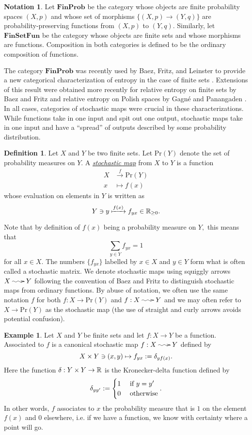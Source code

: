 \documentclass[12pt]{article}
\makeatletter
\theoremstyle{theorem}
\theoremstyle{definition}
\newtheorem{definition}[equation]{Definition}
\newtheorem{example}[equation]{Example}
\newtheorem{notation}[equation]{Notation}
\numberwithin{equation}{section}
\newcommand{\be}{\begin{equation}}
\newcommand{\ee}{\end{equation}}
\newcommand{\bx}{\begin{example}}
\newcommand{\ex}{\end{example}}
\newcommand{\bd}{\begin{definition}}
\newcommand{\ed}{\end{definition}}
\newcommand{\<}{\langle}
\renewcommand{\>}{\rangle}
\def\R{{{\mathbb R}}}
\newcommand{\FinSetFun}{\mathbf{FinSetFun}}
\newcommand{\FinProb}{\mathbf{FinProb}}
\newcommand{\stoch}{\;\xy0;/r.25pc/:\ar@{~>}(3,0);(-3,0);\endxy\;}
\makeatother
\begin{document}
\begin{notation}
\label{not:finprob}
Let $\FinProb$ be the category whose objects are finite probability spaces $(X,p)$
and whose set of morphisms $\big\{(X,p)\to(Y,q)\big\}$ 
are probability-preserving functions from $(X,p)$ to $(Y,q).$
Similarly, let $\FinSetFun$ be the category whose objects are finite sets 
and whose morphisms are functions. 
Composition in both categories is defined to be the ordinary 
composition of functions. 
\end{notation}

The category $\FinProb$ was recently used by Baez, Fritz, and 
Leinster to provide a new categorical characterization of entropy
in the case of finite sets \cite{BFL11}. Extensions of this result
were obtained more recently for relative entropy on finite sets
by Baez and Fritz \cite{BaFr14} and relative entropy on Polish spaces
by Gagn\'e and Panangaden \cite{GaPa17}. 
In all cases, categories of stochastic maps were crucial in 
these characterizations. 
While functions take in one input and spit out one output, 
stochastic maps 
take in one input and have a ``spread'' of outputs
described by some probability distribution. 

\bd
\label{defn:prandstochasticmaps}
Let $X$ and $Y$ be two finite sets. Let $\mathrm{Pr}(Y)$
denote the set of probability measures on $Y.$
A
\emph{\uline{stochastic map}} from $X$ to $Y$ is a function
\be
\begin{split}
X &\xrightarrow{f} \mathrm{Pr}(Y) \\
x &\mapsto f(x)
\end{split}
\ee
whose evaluation on elements in $Y$ is written as 
\be
Y \ni y \xmapsto{f(x)} f_{yx}\in \R_{\ge 0}.
\ee
\ed

Note that by definition of $f(x)$ being a 
probability measure on $Y,$ this means that
\be
\sum_{y \in Y} f_{yx} = 1
\ee
for all $x \in X.$ 
The numbers $\{f_{yx}\}$ labelled by $x\in X$ and $y\in Y$ 
form what is often called a stochastic matrix. 
We denote stochastic maps using squiggly arrows $X \stoch Y$
following the convention of Baez and Fritz \cite{BaFr14}
to distinguish stochastic maps from ordinary functions. 
By abuse of notation, we often use the same notation $f$ for both
$f:X\to\mathrm{Pr}(Y)$ and $f:X\stoch Y$ and we may often refer
to $X\to\mathrm{Pr}(Y)$ as the stochastic map (the use of straight and curly
arrows avoids potential confusion). 

\bx
\label{ex:functionsarestochastic}
Let $X$ and $Y$ be finite sets and let $f:X\to Y$ be a function. 
Associated to $f$ is a canonical stochastic map $f:X\stoch Y$
defined by
\be
X\times Y\ni(x,y)\mapsto{f}_{yx}:=\de_{y f(x)}.
\ee
Here the function $\de:Y\times Y\to\R$ is the Kronecker-delta function
defined by 
\be
\label{eq:Kroneckerdelta}
\de_{y y'}:=
\begin{cases}
1&\mbox{ if $y=y'$}\\
0&\mbox{ otherwise}\\
\end{cases}
.
\ee
In other words, ${f}$ associates to $x$ the probability measure
that is $1$ on the element $f(x)$ and $0$ elsewhere, i.e.
if we have a function, we know with certainty where a point will go. 
\ex
\end{document}
